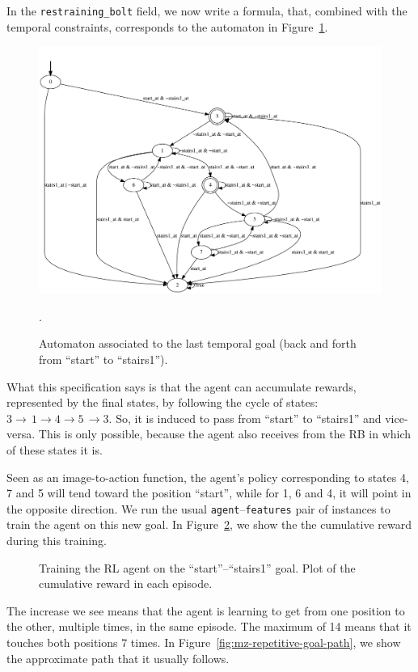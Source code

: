 In the \verb|restraining_bolt| field, we now write a \ldl{} formula, that,
combined with the temporal constraints, corresponds to the automaton in
Figure~\ref{fig:mz-repetitive-goal-automa}.
\begin{figure}
	\centering
	\includegraphics[width=\textwidth]{./imgs/mz-repetitive-goal-automa.pdf}
	\caption{Automaton associated to the last temporal goal (back and forth from
	``start'' to ``stairs1'').}.
	\label{fig:mz-repetitive-goal-automa}
\end{figure}
What this specification says is that the agent can accumulate rewards,
represented by the final states, by following the cycle of states: ${3 \to}\,
1 \to 4 \to 5\, {\to 3}$. So, it is induced to pass from ``start'' to
``stairs1'' and vice-versa. This is only possible, because the agent also
receives from the RB in which of these states it is.

Seen as an image-to-action function, the agent's policy corresponding to
states 4, 7 and 5 will tend toward the position ``start'', while for 1, 6 and
4, it will point in the opposite direction. We run the usual
\texttt{agent}--\texttt{features} pair of instances to train the agent on this
new goal. In Figure~\ref{fig:mz-repetitive-goal-reward}, we show the
the cumulative reward during this training.
\begin{figure}
	\centering
	\caption{Training the RL agent on the ``start''--``stairs1'' goal. Plot of
	the cumulative reward in each episode.}
	\label{fig:mz-repetitive-goal-reward}
\end{figure}
The increase we see means that the agent is learning to get from one position
to the other, multiple times, in the same episode. The maximum of 14 means
that it touches both positions 7 times. In
Figure~\ref{fig:mz-repetitive-goal-path}, we show the approximate path that it
usually follows.

